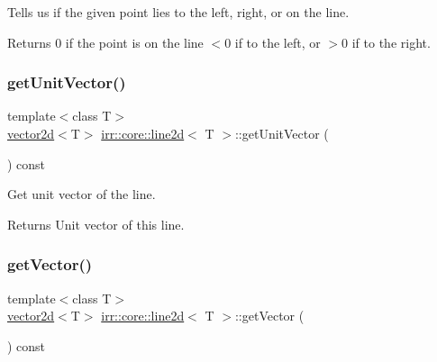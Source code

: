 Tells us if the given point lies to the left, right, or on the line. 

\begin{DoxyReturn}{Returns}
0 if the point is on the line $<$0 if to the left, or $>$0 if to the right. 
\end{DoxyReturn}
\mbox{\label{classirr_1_1core_1_1line2d_ae3f1a52b3057168c41d283d100d13c79}} 
\subsubsection{\texorpdfstring{get\+Unit\+Vector()}{getUnitVector()}}
{\footnotesize\ttfamily template$<$class T$>$ \\
\hyperlink{classirr_1_1core_1_1vector2d}{vector2d}$<$T$>$ \hyperlink{classirr_1_1core_1_1line2d}{irr\+::core\+::line2d}$<$ T $>$\+::get\+Unit\+Vector (\begin{DoxyParamCaption}{ }\end{DoxyParamCaption}) const\hspace{0.3cm}{\ttfamily [inline]}}



Get unit vector of the line. 

\begin{DoxyReturn}{Returns}
Unit vector of this line. 
\end{DoxyReturn}
\mbox{\label{classirr_1_1core_1_1line2d_aeb0b7bc3987165abc0eaca7f0e506a59}} 
\subsubsection{\texorpdfstring{get\+Vector()}{getVector()}}
{\footnotesize\ttfamily template$<$class T$>$ \\
\hyperlink{classirr_1_1core_1_1vector2d}{vector2d}$<$T$>$ \hyperlink{classirr_1_1core_1_1line2d}{irr\+::core\+::line2d}$<$ T $>$\+::get\+Vector (\begin{DoxyParamCaption}{ }\end{DoxyParamCaption}) const\hspace{0.3cm}{\ttfamily [inline]}}



